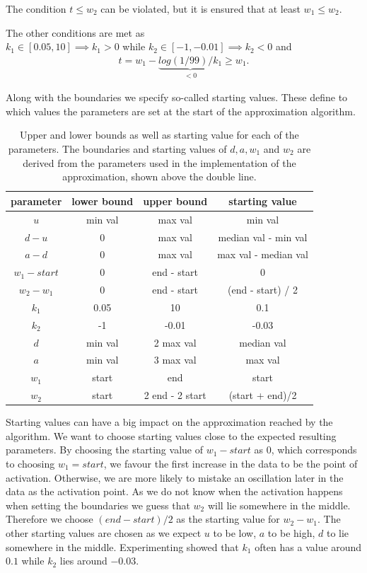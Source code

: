 The condition $t \leq w_2$ can be violated, but it is ensured that at least $w_1 \leq w_2$.
\newpage

The other conditions are met as\\ $k_1 \in [0.05, 10] \implies k_1 > 0$ while $k_2 \in [-1, -0.01] \implies k_2 < 0$ and
\begin{align*}
	t = w_1 - \underbrace{log(1/99) / k_1}_{< 0} \geq w_1.
\end{align*}

Along with the boundaries we specify so-called starting values. These define to which values the parameters are set at the start of the approximation algorithm.

\begin{table}[h!]
	\centering
	\begin{tabular}{|c|c|c|c|}
		\hline
		\textbf{parameter} & \textbf{lower bound} & \textbf{upper bound} & \textbf{starting value} \\ 
		\hline
		$u$ & min val & max val & min val\\
		\hline
		$d - u$ & 0 & max val & median val - min val\\
		\hline
		$a - d$ & 0 & max val & max val - median val\\
		\hline
		$w_1 - start$ & 0 & end - start & 0\\
		\hline
		$w_2 - w_1$ & 0 & end - start & (end - start) / 2\\
		\hline
		$k_1$ & 0.05 & 10 & 0.1\\
		\hline
		$k_2$ & -1 & -0.01 & -0.03\\
		\hline
		\hline
		$d$ & min val & 2 max val & median val \\
		\hline
		$a$ & min val & 3 max val & max val \\
		\hline
		$w_1$ & start & end & start \\
		\hline
		$w_2$ & start & 2 end - 2 start & (start + end)/2\\
		\hline
	\end{tabular}
	\caption{Upper and lower bounds as well as starting value for each of the parameters. The boundaries and starting values of $d, a, w_1$ and $w_2$ are derived from the parameters used in the implementation of the approximation, shown above the double line.}
	\label{tab:boundaries_and_starting_vals}
\end{table}

Starting values can have a big impact on the approximation reached by the algorithm. We want to choose starting values close to the expected resulting parameters. By choosing the starting value of $w_1 - start$ as $0$, which corresponds to choosing $w_1 = start$, we favour the first increase in the data to be the point of activation. Otherwise, we are more likely to mistake an oscillation later in the data as the activation point. As we do not know when the activation happens when setting the boundaries we guess that $w_2$ will lie somewhere in the middle. Therefore we choose $(end - start)/2$ as the starting value for $w_2 - w_1$. The other starting values are chosen as we expect $u$ to be low, $a$ to be high, $d$ to lie somewhere in the middle. Experimenting showed that $k_1$ often has a value around $0.1$ while $k_2$ lies around $-0.03$.

